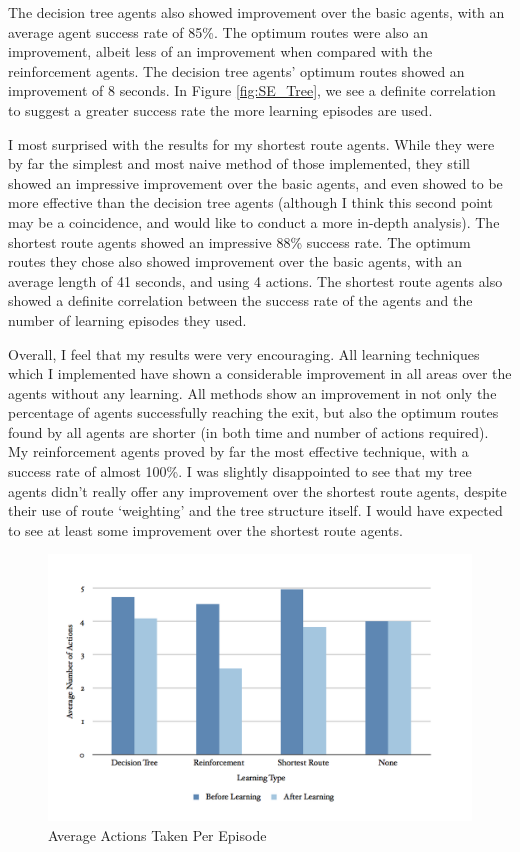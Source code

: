 \documentclass[a4paper,oneside]{report}
\begin{document}
The decision tree agents also showed improvement over the basic agents, with an average agent success rate of 85\%. The optimum routes were also an improvement, albeit less of an improvement when compared with the reinforcement agents. The decision tree agents' optimum routes showed an improvement of 8 seconds. In Figure \ref{fig:SE_Tree}, we see a definite correlation to suggest a greater success rate the more learning episodes are used.

I most surprised with the results for my shortest route agents. While they were by far the simplest and most naive method of those implemented, they still showed an impressive improvement over the basic agents, and even showed to be more effective than the decision tree agents (although I think this second point may be a coincidence, and would like to conduct a more in-depth analysis). The shortest route agents showed an impressive 88\% success rate. The optimum routes they chose also showed improvement over the basic agents, with an average length of 41 seconds, and using 4 actions. The shortest route agents also showed a definite correlation between the success rate of the agents and the number of learning episodes they used.

Overall, I feel that my results were very encouraging. All learning techniques which I implemented have shown a considerable improvement in all areas over the agents without any learning. All methods show an improvement in not only the percentage of agents successfully reaching the exit, but also the optimum routes found by all agents are shorter (in both time and number of actions required). My reinforcement agents proved by far the most effective technique, with a success rate of almost 100\%. I was slightly disappointed to see that my tree agents didn't really offer any improvement over the shortest route agents, despite their use of route `weighting' and the tree structure itself. I would have expected to see at least some improvement over the shortest route agents.
\newpage

\begin{figure}[H]
  \centering
    \includegraphics[width=130mm]{sources/images/AvgActions}
    \caption{Average Actions Taken Per Episode}
    \label{fig:AvgActions}
\end{figure}
\end{document}
